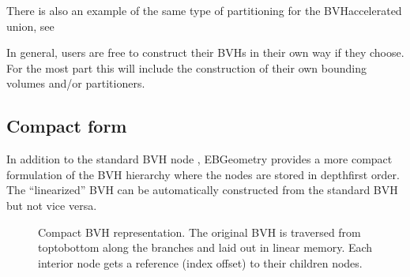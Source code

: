 \documentclass[letterpaper,10pt,english]{sphinxmanual}
\let\sphinxpxdimen\pdfpxdimen\else\newdimen\sphinxpxdimen
\begin{document}
\begin{itemize}
\sphinxAtStartPar
There is also an example of the same type of partitioning for the BVH\sphinxhyphen{}accelerated union, see 

\end{itemize}

\sphinxAtStartPar
In general, users are free to construct their BVHs in their own way if they choose.
For the most part this will include the construction of their own bounding volumes and/or partitioners.


\subsection{Compact form}
\label{\detokenize{ImplemBVH:compact-form}}\label{\detokenize{ImplemBVH:chap-linearbvh}}
\sphinxAtStartPar
In addition to the standard BVH node , EBGeometry provides a more compact formulation of the BVH hierarchy where the nodes are stored in depth\sphinxhyphen{}first order.
The “linearized” BVH can be automatically constructed from the standard BVH but not vice versa.

\begin{figure}[htbp]
\centering
\capstart

\noindent\sphinxincludegraphics[width=240\sphinxpxdimen]{{CompactBVH}.png}
\caption{Compact BVH representation.
The original BVH is traversed from top\sphinxhyphen{}to\sphinxhyphen{}bottom along the branches and laid out in linear memory.
Each interior node gets a reference (index offset) to their children nodes.}\label{\detokenize{ImplemBVH:id3}}\end{figure}
\end{document}
